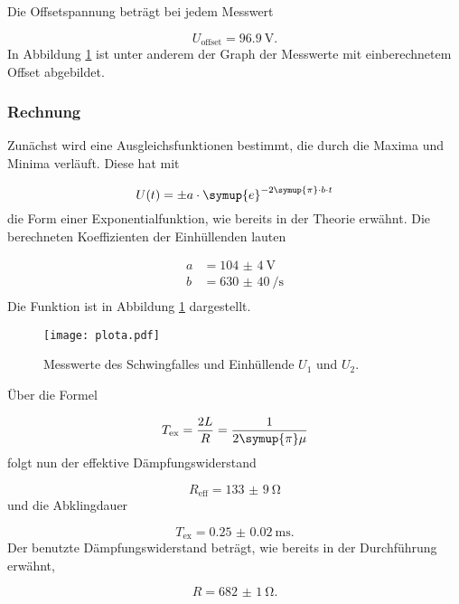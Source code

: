 Die Offsetspannung beträgt bei jedem Messwert

\begin{equation}
  U_\text{offset} = \SI{96.9}{\V}.
\end{equation}
In Abbildung \ref{fig:Schwingfall} ist unter anderem der Graph der Messwerte
mit einberechnetem Offset abgebildet.

\subsubsection{Rechnung}

Zunächst wird eine Ausgleichsfunktionen bestimmt, die durch die Maxima und
Minima verläuft.
Diese hat mit

\begin{equation}
  U(t) = \pm a \cdot \symup{e}^{-2\symup{\pi}\cdot b \cdot t}
\end{equation}
die Form einer Exponentialfunktion, wie bereits in der Theorie erwähnt.
Die berechneten Koeffizienten der Einhüllenden lauten

\begin{align}
  a & = \SI{104(4)}{\V} \\
  b & = \SI{630(40)}{\per\second} \\
\end{align}
Die Funktion ist in Abbildung \ref{fig:Schwingfall} dargestellt.

\begin{figure}[h]
  \centering
  \texttt{[image: plota.pdf]}
  \caption{Messwerte des Schwingfalles und Einhüllende $U_1$ und $U_2$.}
  \label{fig:Schwingfall}
\end{figure}

Über die Formel

\begin{equation}
  T_\text{ex} = \frac{2L}{R} = \frac{1}{2\symup{\pi}\mu}
\end{equation}
folgt nun der effektive Dämpfungswiderstand

\begin{equation}
  R_\text{eff} = \SI{133(9)}{\ohm}
\end{equation}
und die Abklingdauer

\begin{equation}
  T_\text{ex} = \SI{0.25(2)}{\milli\second} .
\end{equation}
Der benutzte Dämpfungswiderstand beträgt, wie bereits in der Durchführung
erwähnt,

\begin{equation}
  R = \SI{682(1)}{\ohm} .
\end{equation}


